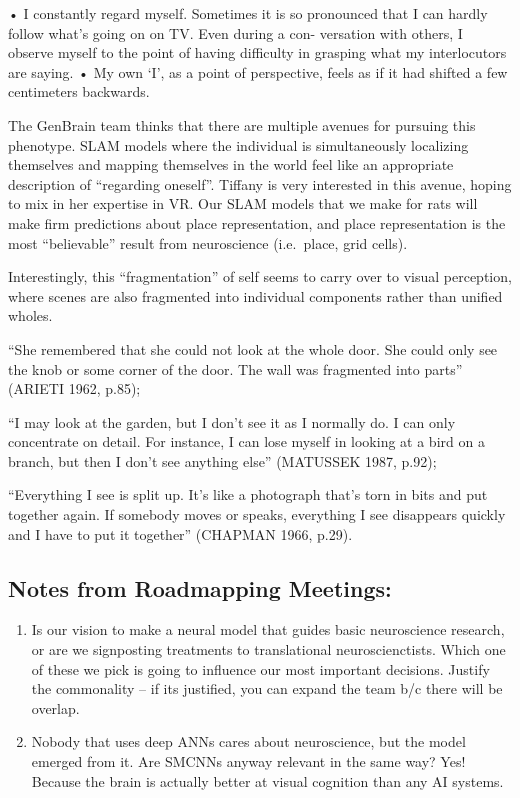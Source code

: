 \documentclass[
  letterpaper,
  DIV=11,
  numbers=noendperiod]{scrartcl}
\begin{document}
• I constantly regard myself. Sometimes it is so pronounced that I can
hardly follow what's going on on TV. Even during a con- versation with
others, I observe myself to the point of having difficulty in grasping
what my interlocutors are saying. • My own `I', as a point of
perspective, feels as if it had shifted a few centimeters backwards.

The GenBrain team thinks that there are multiple avenues for pursuing
this phenotype. SLAM models where the individual is simultaneously
localizing themselves and mapping themselves in the world feel like an
appropriate description of ``regarding oneself''. Tiffany is very
interested in this avenue, hoping to mix in her expertise in VR. Our
SLAM models that we make for rats will make firm predictions about place
representation, and place representation is the most ``believable''
result from neuroscience (i.e.~place, grid cells).

Interestingly, this ``fragmentation'' of self seems to carry over to
visual perception, where scenes are also fragmented into individual
components rather than unified wholes.

``She remembered that she could not look at the whole door. She could
only see the knob or some corner of the door. The wall was fragmented
into parts'' (ARIETI 1962, p.85);

``I may look at the garden, but I don't see it as I normally do. I can
only concentrate on detail. For instance, I can lose myself in looking
at a bird on a branch, but then I don't see anything else'' (MATUSSEK
1987, p.92);

``Everything I see is split up. It's like a photograph that's torn in
bits and put together again. If somebody moves or speaks, everything I
see disappears quickly and I have to put it together'' (CHAPMAN 1966,
p.29).

\subsection{Notes from Roadmapping
Meetings:}\label{notes-from-roadmapping-meetings}

\begin{enumerate}
\def\labelenumi{\arabic{enumi}.}
\item
  Is our vision to make a neural model that guides basic neuroscience
  research, or are we signposting treatments to translational
  neuroscienctists. Which one of these we pick is going to influence our
  most important decisions. Justify the commonality -- if its justified,
  you can expand the team b/c there will be overlap.
\item
  Nobody that uses deep ANNs cares about neuroscience, but the model
  emerged from it. Are SMCNNs anyway relevant in the same way? Yes!
  Because the brain is actually better at visual cognition than any AI
  systems.
\end{enumerate}
\end{document}

